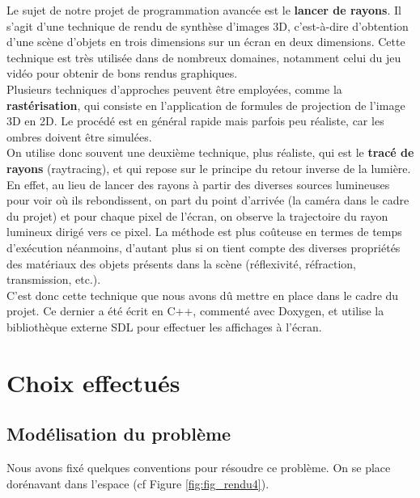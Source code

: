 \documentclass[a4paper,oneside,12pt,titlepage]{article}
\begin{document}
\begin{sloppypar}

Le sujet de notre projet de programmation avancée est le \textbf{lancer de rayons}. Il s’agit d’une technique de rendu de synthèse d’images 3D, c’est-à-dire d’obtention d’une scène d’objets en trois dimensions sur un écran en deux dimensions. Cette technique est très utilisée dans de nombreux domaines, notamment celui du jeu vidéo pour obtenir de bons rendus graphiques. \\[6pt]

Plusieurs techniques d’approches peuvent être employées, comme la \textbf{rastérisation}, qui consiste en l’application de formules de projection de l’image 3D en 2D. Le procédé est en général rapide mais parfois peu réaliste, car les ombres doivent être simulées. \\[6pt]

On utilise donc souvent une deuxième technique, plus réaliste, qui est le \textbf{tracé de rayons} (raytracing), et qui repose sur le principe du retour inverse de la lumière. En effet, au lieu de lancer des rayons à partir des diverses sources lumineuses pour voir où ils rebondissent, on part du point d’arrivée (la caméra dans le cadre du projet) et pour chaque pixel de l’écran, on observe la trajectoire du rayon lumineux dirigé vers ce pixel. La méthode est plus coûteuse en termes de temps d’exécution néanmoins, d’autant plus si on tient compte des diverses propriétés des matériaux des objets présents dans la scène (réflexivité, réfraction, transmission, etc.). \\[6pt]

C’est donc cette technique que nous avons dû mettre en place dans le cadre du projet. Ce dernier a été écrit en C++, commenté avec Doxygen, et utilise la bibliothèque externe SDL pour effectuer les affichages à l’écran.

\newpage

\section{Choix effectués}

\subsection{Modélisation du problème}

Nous avons fixé quelques conventions pour résoudre ce problème. On se place dorénavant dans l’espace (cf Figure \ref{fig:fig_rendu4}). \\[6pt]


\end{sloppypar}
\end{document}
